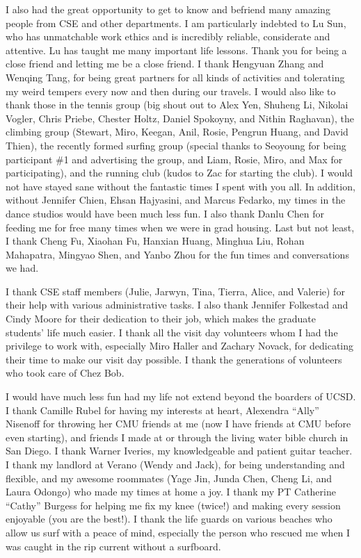 \begin{acknowledgements}
I also had the great opportunity to get to know and befriend many amazing people from CSE and other departments. I am particularly indebted to Lu Sun, who has unmatchable work ethics and is incredibly reliable, considerate and attentive. Lu has taught me many important life lessons. Thank you for being a close friend and letting me be a close friend. I thank Hengyuan Zhang and Wenqing Tang, for being great partners for all kinds of activities and tolerating my weird tempers every now and then during our travels. I would also like to thank those in the tennis group (big shout out to Alex Yen, Shuheng Li, Nikolai Vogler, Chris Priebe, Chester Holtz, Daniel Spokoyny, and Nithin Raghavan), the climbing group (Stewart, Miro, Keegan, Anil, Rosie, Pengrun Huang, and David Thien), the recently formed surfing group (special thanks to Seoyoung for being participant \#1 and advertising the group, and Liam, Rosie, Miro, and Max for participating), and the running club (kudos to Zac for starting the club). I would not have stayed sane without the fantastic times I spent with you all. In addition, without Jennifer Chien, Ehsan Hajyasini, and Marcus Fedarko,
my times in the dance studios would have been much less fun.
I also thank Danlu Chen for feeding me for free many times when we were in grad housing. Last but not least, I thank Cheng Fu, Xiaohan Fu, Hanxian Huang, Minghua Liu, Rohan Mahapatra, Mingyao Shen, and Yanbo Zhou for the fun times and conversations we had.

I thank CSE staff members (Julie, Jarwyn, Tina, Tierra, Alice, and Valerie) for their help with various administrative tasks. I also thank Jennifer Folkestad and Cindy Moore for their dedication to their job, which makes the graduate students' life much easier. I thank all the visit day volunteers whom I had the privilege to work with, especially Miro Haller and Zachary Novack, for dedicating their time to make our visit day possible. I thank the generations of volunteers who took care of Chez Bob.

I would have much less fun had my life not extend beyond the boarders of UCSD. I thank Camille Rubel for having my interests at heart, Alexendra ``Ally'' Nisenoff for throwing her CMU friends at me (now I have friends at CMU before even starting), and friends I made at or through the living water bible church in San Diego. I thank Warner Iveries, my knowledgeable and patient guitar teacher. I thank my landlord at Verano (Wendy and Jack), for being understanding and flexible, and my awesome roommates (Yage Jin, Junda Chen, Cheng Li, and Laura Odongo) who made my times at home a joy. I thank my PT Catherine ``Cathy'' Burgess for helping me fix my knee (twice!) and making every session enjoyable (you are the best!). I thank the life guards on various beaches who allow us surf with a peace of mind, especially the person who rescued me when I was caught in the rip current without a surfboard.



\end{acknowledgements}
